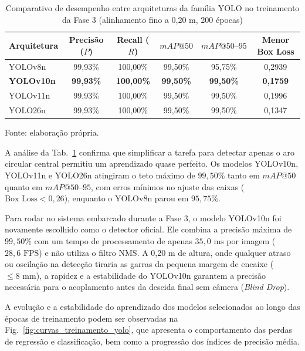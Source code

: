 \begin{table}[H]
	\centering
	\small
	\setlength{\tabcolsep}{5pt}
	\captionsetup{justification=centering}
	\caption{Comparativo de desempenho entre arquiteturas da família YOLO no treinamento da Fase 3 (alinhamento fino a 0,20 m, 200 épocas)}
	\label{tab:comparativo_yolo_fase3}
	\vspace{0.2cm}
	\begin{tabular}{lccccc}
		\hline
		\textbf{Arquitetura} & \textbf{Precisão ($P$)} & \textbf{Recall ($R$)} & \textbf{$mAP@50$} & \textbf{$mAP@50\text{--}95$} & \textbf{Menor Box Loss} \\
		\hline
		YOLOv8n  & 99,93\% & 100,00\% & 99,50\% & 95,75\% & 0,2939 \\
		\textbf{YOLOv10n} & \textbf{99,93\%} & \textbf{100,00\%} & \textbf{99,50\%} & \textbf{99,50\%} & \textbf{0,1759} \\
		YOLOv11n & 99,93\% & 100,00\% & 99,50\% & 99,50\% & 0,1996 \\
		YOLO26n  & 99,93\% & 100,00\% & 99,50\% & 99,50\% & 0,1347 \\
		\hline
	\end{tabular}
	\vspace{0.2cm}
	\begin{flushleft}
		\footnotesize Fonte: elaboração própria.
	\end{flushleft}
\end{table}

A análise da Tab.~\ref{tab:comparativo_yolo_fase3} confirma que simplificar a tarefa para detectar apenas o aro circular central permitiu um aprendizado quase perfeito. Os modelos YOLOv10n, YOLOv11n e YOLO26n atingiram o teto máximo de $99,50\%$ tanto em $mAP@50$ quanto em $mAP@50\text{--}95$, com erros mínimos no ajuste das caixas ($\text{Box Loss} < 0,26$), enquanto o YOLOv8n parou em $95,75\%$.

Para rodar no sistema embarcado durante a Fase 3, o modelo YOLOv10n foi novamente escolhido como o detector oficial. Ele combina a precisão máxima de $99,50\%$ com um tempo de processamento de apenas $35,0\text{ ms}$ por imagem ($28,6\text{ FPS}$) e não utiliza o filtro NMS. A 0,20 m de altura, onde qualquer atraso ou oscilação na detecção tiraria as garras da pequena margem de encaixe ($\le 8\text{ mm}$), a rapidez e a estabilidade do YOLOv10n garantem a precisão necessária para o acoplamento antes da descida final sem câmera (\textit{Blind Drop}).

A evolução e a estabilidade do aprendizado dos modelos selecionados ao longo das épocas de treinamento podem ser observadas na Fig.~\ref{fig:curvas_treinamento_yolo}, que apresenta o comportamento das perdas de regressão e classificação, bem como a progressão dos índices de precisão média.


